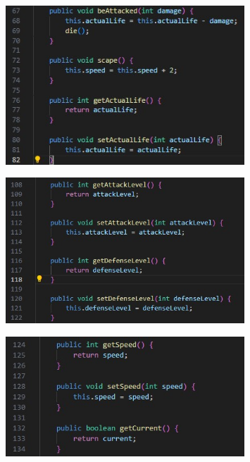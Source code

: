 \documentclass{article}
\begin{document}
	\begin{figure}[H]
		\centering
		\includegraphics[width=0.8\textwidth,keepaspectratio]{img/method2.jpg}
	\end{figure}
	
	\begin{figure}[H]
		\centering
		\includegraphics[width=0.8\textwidth,keepaspectratio]{img/method3.jpg}
	\end{figure}
	
	\begin{figure}[H]
		\centering
		\includegraphics[width=0.8\textwidth,keepaspectratio]{img/method4.jpg}
	\end{figure}
	
\end{document}

